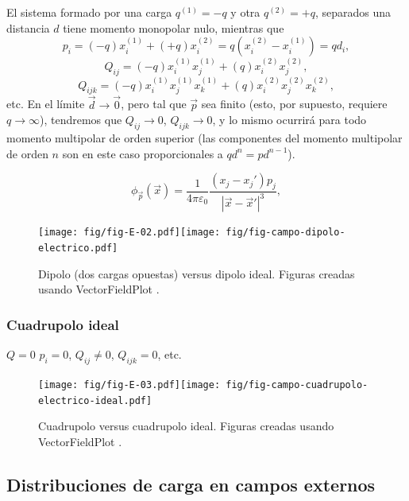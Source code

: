 El sistema formado por una carga $q^{(1)}=-q$ y otra $q^{(2)}=+q$, separados una distancia $d$ tiene momento monopolar nulo, mientras que 
\begin{equation}
p_i=(-q)x^{(1)}_i+(+q)x^{(2)}_i=q(x^{(2)}_i-x^{(1)}_i)=qd_i,
\end{equation}
\begin{equation}
Q_{ij}=(-q)x^{(1)}_i x^{(1)}_j +(q)x^{(2)}_i x^{(2)}_j,
\end{equation}
\begin{equation}
Q_{ijk}=(-q)x^{(1)}_i x^{(1)}_jx^{(1)}_k +(q)x^{(2)}_i x^{(2)}_jx^{(2)}_k,
\end{equation}
etc. En el límite $\vec{d}\to\vec{0}$, pero tal que $\vec{p}$ sea finito (esto, por supuesto, requiere $q\to\infty$), tendremos que $Q_{ij}\to 0$, $Q_{ijk}\to 0$, y lo mismo ocurrirá para todo momento multipolar de orden superior  (las componentes del momento multipolar de orden $n$ son en este caso proporcionales a $qd^n=pd^{n-1}$).

\begin{equation}\label{phip}
\phi_{\vec{p}}(\vec{x})=\frac{1}{4\pi\varepsilon_0}\frac{(x_j-x_j')p_j}
{|\vec{x}-\vec{x}'|^3},
\end{equation}
\begin{figure}[H]
\begin{center}
\texttt{[image: fig/fig-E-02.pdf]}\hspace{1cm}\texttt{[image: fig/fig-campo-dipolo-electrico.pdf]} 
\caption{Dipolo (dos cargas opuestas) versus dipolo ideal. Figuras creadas usando VectorFieldPlot \cite{VFP}.}
\label{fig-dipolos}
\end{center}
\end{figure}
\subsubsection{Cuadrupolo ideal}
$Q=0$ $p_i=0$, $Q_{ij}\neq 0$, $Q_{ijk}=0$, etc.

\begin{figure}[H]
\begin{center}
\texttt{[image: fig/fig-E-03.pdf]}\hspace{1cm}\texttt{[image: fig/fig-campo-cuadrupolo-electrico-ideal.pdf]} 
\caption{Cuadrupolo versus cuadrupolo ideal. Figuras creadas usando VectorFieldPlot \cite{VFP}.}
\label{fig-dipolos2}
\end{center}
\end{figure}
\newpage


\subsection{Distribuciones de carga en campos externos} \label{ed3_3}

